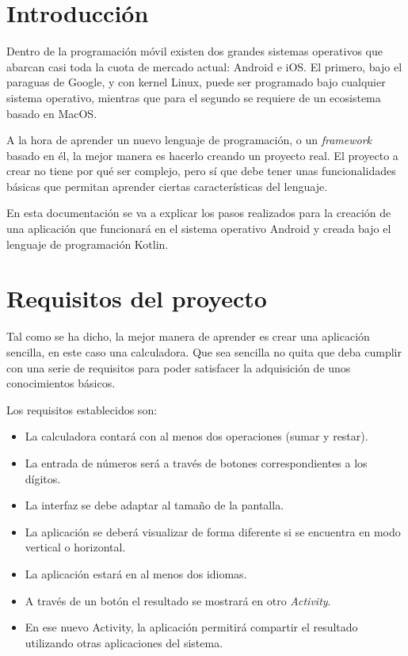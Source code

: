 \documentclass{\ClassPath/viu-tfm-template}
\begin{document}
    \graphicspath{{../../VIU_TFM_LaTeX_template/}}

    \coverpage

    \tableofcontents

\chapter{Introducción}

Dentro de la programación móvil existen dos grandes sistemas operativos que abarcan casi toda la cuota de mercado actual: Android e iOS. El primero, bajo el paraguas de Google, y con kernel Linux, puede ser programado bajo cualquier sistema operativo, mientras que para el segundo se requiere de un ecosistema basado en MacOS.

A la hora de aprender un nuevo lenguaje de programación, o un \textit{framework} basado en él, la mejor manera es hacerlo creando un proyecto real. El proyecto a crear no tiene por qué ser complejo, pero sí que debe  tener unas funcionalidades básicas que permitan aprender ciertas características del lenguaje.

En esta documentación se va a explicar los pasos realizados para la creación de una aplicación que funcionará en el sistema operativo Android y creada bajo el lenguaje de programación Kotlin.


\chapter{Requisitos del proyecto}

Tal como se ha dicho, la mejor manera de aprender es crear una aplicación sencilla, en este caso una calculadora. Que sea sencilla no quita que deba cumplir con una serie de requisitos para poder satisfacer la adquisición de unos conocimientos básicos.

Los requisitos establecidos son:

\begin{itemize}
    \item La calculadora contará con al menos dos operaciones (sumar y restar).
    \item La entrada de números será a través de botones correspondientes a los dígitos.
    \item La interfaz se debe adaptar al tamaño de la pantalla.
    \item La aplicación se deberá visualizar de forma diferente si se encuentra en modo vertical o horizontal.
    \item La aplicación estará en al menos dos idiomas.
    \item A través de un botón el resultado se mostrará en otro \textit{Activity}.
    \item En ese nuevo Activity, la aplicación permitirá compartir el resultado utilizando otras aplicaciones del sistema.
\end{itemize}
\end{document}
